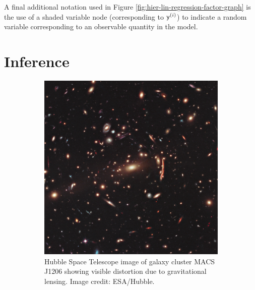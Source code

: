 A final additional notation used in Figure \ref{fig:hier-lin-regression-factor-graph} is the use of a shaded variable node (corresponding to $\mathsf{y}^{(i)}$) to indicate a random variable corresponding to an observable quantity in the model.

\newpage

\section{Inference}

\begin{figure}[!t]
\centering
\begin{subfigure}[b]{.46\linewidth}
\vskip 0pt
\centering
\includegraphics[width=\textwidth]{images/gravitation-lensing-macs-j1206-nasa-square-crop}
\vskip 0pt
\caption{Hubble Space Telescope image of galaxy cluster MACS J1206 showing visible distortion due to gravitational lensing. Image credit: ESA/Hubble.}
\label{sfig:gravitational-lensing-photo}
\end{subfigure}%
\hspace*{\fill}
\begin{subfigure}[b]{.46\linewidth}
\vskip 0pt
\centering

\end{subfigure}
\end{figure}
